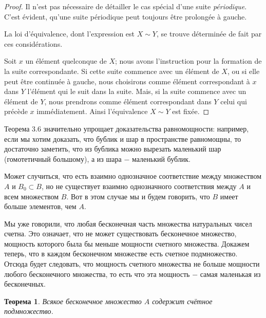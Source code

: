 \documentclass{article}
\newtheorem{theorem}{Теорема}[section]
\begin{document}
\begin{proof}
Il n'est pas nécessaire de détailler le cas spécial d'une suite \textit{périodique}. C'est évident, qu'une suite périodique peut toujours être prolongée à gauche.

La loi d'équivalence, dont l'expression est \(X \sim Y\), se trouve déterminée de fait par ces considérations.

Soit \(x\) un élément quelconque de \(X\); nous avons l'instruction pour la formation de la suite correspondante. Si cette suite commence avec un élément de \(X\), ou si elle peut être continuée à gauche, nous choisirons comme élément correspondant à \(x\) dans \(Y\) l'élément qui le suit dans la suite. Mais, si la suite commence avec un élément de \(Y\), nous prendrons comme élément correspondant dans \(Y\) celui qui précède \(x\) immédiatement. Ainsi l'équivalence \(X \sim Y\) est fixée.
\end{proof}

Теорема 3.6 значительно упрощает доказательства равномощности: например, если мы хотим доказать, что бублик и шар в пространстве равномощны, то достаточно заметить, что из бублика можно вырезать маленький шар (гомотетичный большому), а из шара \(-\) маленький бублик. \newline

Может случиться, что есть взаимно однозначное соответствие между множеством \(A\) и \(B_0 \subset B\), но не существует взаимно однозначного соответствия между \(A\) и всем множеством \(B\). Вот в этом случае мы и будем говорить, что \(B\) имеет больше элементов, чем \(A\). \newline

Мы уже говорили, что любая бесконечная часть множества натуральных чисел счетна. Это означает, что не может существовать бесконечное множество, мощность которого была бы меньше мощности счетного множества. Докажем теперь, что в каждом бесконечном множестве есть счетное подмножество. Отсюда будет следовать, что мощность счетного множества не больше мощности любого бесконечного множества, то есть что эта мощность \(-\) самая маленькая из бесконечных.

\begin{theorem}
Всякое бесконечное множество \(A\) содержит счётное подмножество.
\end{theorem}
\end{document}

